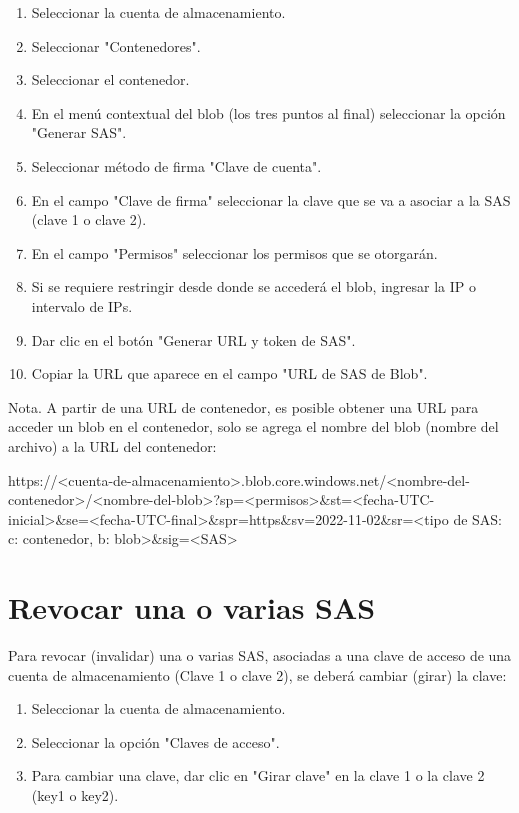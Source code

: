\begin{enumerate}
\item Seleccionar la cuenta de almacenamiento.
\item Seleccionar "Contenedores".
\item Seleccionar el contenedor.
\item En el menú contextual del blob (los tres puntos al final) seleccionar la opción "Generar SAS".
\item Seleccionar método de firma "Clave de cuenta".
\item En el campo "Clave de firma" seleccionar la clave que se va a asociar a la SAS (clave 1 o clave 2).
\item En el campo "Permisos" seleccionar los permisos que se otorgarán.
\item Si se requiere restringir desde donde se accederá el blob, ingresar la IP o intervalo de IPs.
\item Dar clic en el botón "Generar URL y token de SAS".
\item Copiar la URL que aparece en el campo "URL de SAS de Blob".
\end{enumerate}

Nota. A partir de una URL de contenedor, es posible obtener una URL para acceder un blob en el contenedor, solo se agrega el nombre del blob (nombre del archivo) a la URL del contenedor:

https://<cuenta-de-almacenamiento>.blob.core.windows.net/<nombre-del-contenedor>/<nombre-del-blob>?sp=<permisos>\&st=<fecha-UTC-inicial>\&se=<fecha-UTC-final>\&spr=https\&sv=2022-11-02\&sr=<tipo de SAS: c: contenedor, b: blob>\&sig=<SAS>

\section{Revocar una o varias SAS}

Para revocar (invalidar) una o varias SAS, asociadas a una clave de acceso de una cuenta de almacenamiento (Clave 1 o clave 2), se deberá cambiar (girar) la clave:

\begin{enumerate}
\item Seleccionar la cuenta de almacenamiento.
\item Seleccionar la opción "Claves de acceso".
\item Para cambiar una clave, dar clic en "Girar clave" en la clave 1 o la clave 2 (key1 o key2).
\end{enumerate}

